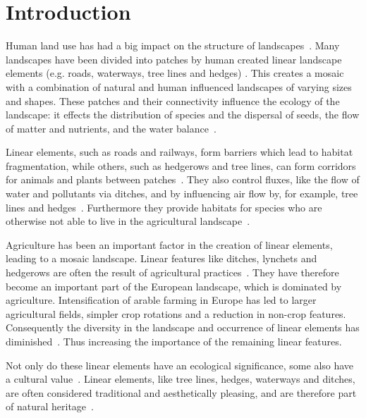 \section{Introduction}
Human land use has had a big impact on the structure of landscapes~\citep{turner1989landscape}. Many landscapes have been divided into patches by human created linear landscape elements (e.g. roads, waterways, tree lines and hedges) \citep{meyer2012multifunctional}. This creates a mosaic with a combination of natural and human influenced landscapes of varying sizes and shapes. These patches and their connectivity influence the ecology of the landscape: it effects the distribution of species and the dispersal of seeds, the flow of matter and nutrients, and the water balance~\citep{turner1989landscape}.

Linear elements, such as roads and railways, form barriers which lead to habitat fragmentation, while others, such as hedgerows and tree lines, can form corridors for animals and plants between patches~\citep{spellerberg1999introduction}. They also control fluxes, like the flow of water and pollutants via ditches, and by influencing air flow by, for example, tree lines and hedges~\citep{burel1996hedgerows}. Furthermore they provide habitats for species who are otherwise not able to live in the agricultural landscape~\citep{spellerberg1999introduction}.

Agriculture has been an important factor in the creation of linear elements, leading to a mosaic landscape. Linear features like ditches, lynchets and hedgerows are often the result of agricultural practices~\citep{bailly2008agrarian}. They have therefore become an important part of the European landscape, which is dominated by agriculture. Intensification of arable farming in Europe has led to larger agricultural fields, simpler crop rotations and a reduction in non-crop features. Consequently the diversity in the landscape and occurrence of linear elements has diminished~\citep{stoate2001ecological}. Thus increasing the importance of the remaining linear features.

Not only do these linear elements have an ecological significance, some also have a cultural value~\citep{jongman2004landscape}. Linear elements, like tree lines, hedges, waterways and ditches, are often considered traditional and aesthetically pleasing, and are therefore part of natural heritage~\citep{gobster2007shared}.

\medskip

